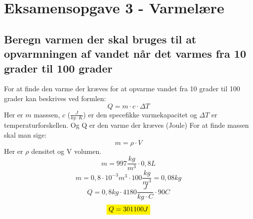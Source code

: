 \section{Eksamensopgave 3 - Varmelære}
\subsection{Beregn varmen der skal bruges til at opvarmningen af vandet når det varmes fra 10 grader til 100 grader}
For at finde den varme der kræves for at opvarme vandet fra 10 grader til 100 grader kan beskrives ved formlen: 
\begin{equation*}
    Q=m \cdot c \cdot \Delta T
\end{equation*}
Her er \begin{math}m\end{math} masssen, \begin{math}c\end{math} (\begin{math}
    \frac{J}{kg \cdot K}
\end{math}) er den specefikke varmekapacitet og $\Delta T$ er temperaturforskellen. Og Q er den varme der kræves (Joule)
For at finde massen skal man sige: 
\begin{equation*}
    m=\rho \cdot V
\end{equation*}
Her er $\rho$ densitet og V volumen.
\begin{equation*}
    m=997 \frac{kg}{m^3} \cdot 0,8 L
\end{equation*}
\begin{equation*}
    m=0,8 \cdot 10^{-3} m^3  \cdot 100 \frac{kg}{m^3}=0,08 kg
\end{equation*}
\begin{equation*}
    Q=0,8 kg \cdot 4180 \frac{J}{kg \cdot C} \cdot 90C
\end{equation*}
\begin{equation*}
    \mathcolorbox{yellow}{Q=301100 J}
\end{equation*}
